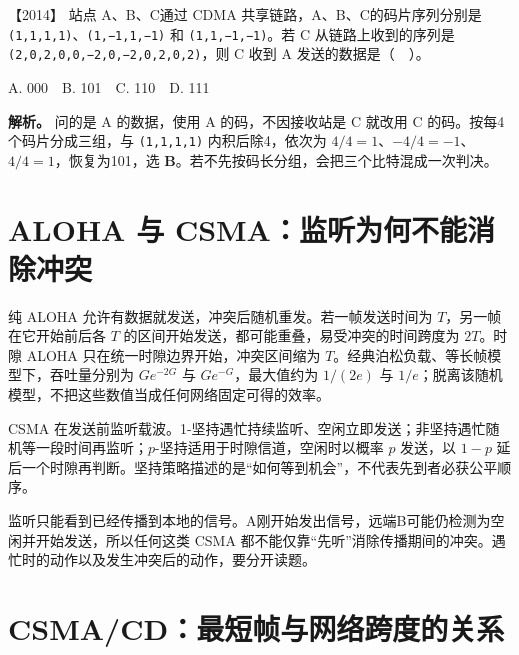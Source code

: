\noindent{}【2014】 站点 A、B、C通过 CDMA 共享链路，A、B、C的码片序列分别是 \allowbreak{}\texttt{(1,}\allowbreak{}\texttt{1,}\allowbreak{}\texttt{1,}\allowbreak{}\texttt{1)}、\allowbreak{}\texttt{(1,}\allowbreak{}\texttt{−1,}\allowbreak{}\texttt{1,}\allowbreak{}\texttt{−1)} 和 \allowbreak{}\texttt{(1,}\allowbreak{}\texttt{1,}\allowbreak{}\texttt{−1,}\allowbreak{}\texttt{−1)}。若 C 从链路上收到的序列是 \allowbreak{}\texttt{(2,}\allowbreak{}\texttt{0,}\allowbreak{}\texttt{2,}\allowbreak{}\texttt{0,}\allowbreak{}\texttt{0,}\allowbreak{}\texttt{−2,}\allowbreak{}\texttt{0,}\allowbreak{}\texttt{−2,}\allowbreak{}\texttt{0,}\allowbreak{}\texttt{2,}\allowbreak{}\texttt{0,}\allowbreak{}\texttt{2)}，则 C 收到 A 发送的数据是（　）。

A. 000　B. 101　C. 110　D. 111


\textbf{解析。} 问的是 A 的数据，使用 A 的码，不因接收站是 C 就改用 C 的码。按每4个码片分成三组，与 \allowbreak{}\texttt{(1,}\allowbreak{}\texttt{1,}\allowbreak{}\texttt{1,}\allowbreak{}\texttt{1)} 内积后除4，依次为 \(4/4=1\)、\(-4/4=-1\)、\(4/4=1\)，恢复为101，选 \textbf{B}。若不先按码长分组，会把三个比特混成一次判决。

\section{ALOHA 与 CSMA：监听为何不能消除冲突}\label{cn-03-10}

纯 ALOHA 允许有数据就发送，冲突后随机重发。若一帧发送时间为 \(T\)，另一帧在它开始前后各 \(T\) 的区间开始发送，都可能重叠，易受冲突的时间跨度为 \(2T\)。时隙 ALOHA 只在统一时隙边界开始，冲突区间缩为 \(T\)。经典泊松负载、等长帧模型下，吞吐量分别为 \(Ge^{-2G}\) 与 \(Ge^{-G}\)，最大值约为 \(1/(2e)\) 与 \(1/e\)；脱离该随机模型，不把这些数值当成任何网络固定可得的效率。

CSMA 在发送前监听载波。1-坚持遇忙持续监听、空闲立即发送；非坚持遇忙随机等一段时间再监听；\(p\)-坚持适用于时隙信道，空闲时以概率 \(p\) 发送，以 \(1-p\) 延后一个时隙再判断。坚持策略描述的是``如何等到机会''，不代表先到者必获公平顺序。

监听只能看到已经传播到本地的信号。A刚开始发出信号，远端B可能仍检测为空闲并开始发送，所以任何这类 CSMA 都不能仅靠``先听''消除传播期间的冲突。遇忙时的动作以及发生冲突后的动作，要分开读题。

\section{CSMA/CD：最短帧与网络跨度的关系}\label{cn-03-11}

